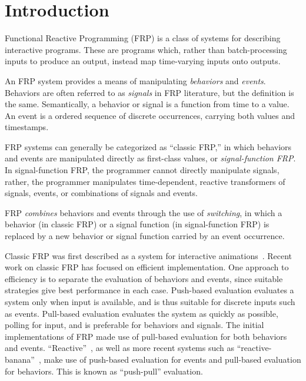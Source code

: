 \section{Introduction}
\label{section:Introduction}

Functional Reactive Programming (FRP) is a class of systems for describing
interactive programs. These are programs which, rather than batch-processing
inputs to produce an output, instead map time-varying inputs onto outputs.


An FRP system provides a means of manipulating {\em behaviors} and
{\em events}. Behaviors are often referred to as {\em signals} in FRP literature,
but the definition is the same.  Semantically, a behavior or signal is a
function from time to a value. An event is a ordered sequence of discrete
occurrences, carrying both values and timestamps.

FRP systems can generally be categorized as ``classic FRP,'' in which behaviors
and events are manipulated directly as first-class values,
or {\em signal-function FRP}. In signal-function FRP, the programmer cannot
directly manipulate signals, rather, the programmer manipulates time-dependent,
reactive transformers of signals, events, or combinations of signals and events.

FRP {\em combines} behaviors and events through the use of {\em switching}, in which
a behavior (in classic FRP) or a signal function (in signal-function FRP) is
replaced by a new behavior or signal function carried by an event occurrence.


Classic FRP was first described as a system for interactive animations~\cite{Elliott1997}.
Recent work on classic FRP has focused on efficient implementation. One approach
to efficiency is to separate the evaluation of behaviors and events, since
suitable strategies give best performance in each case. Push-based evaluation
evaluates a system only when input is available, and is thus suitable for
discrete inputs such as events. Pull-based evaluation evaluates the system as
quickly as possible, polling for input, and is preferable for behaviors and
signals. The initial implementations of FRP made use of pull-based evaluation
for both behaviors and events. ``Reactive''~\cite{Elliott2009}, as well as more
recent systems such as ``reactive-banana''~\cite{Apfelmus}, make use of
push-based evaluation for events and pull-based evaluation for behaviors. This
is known as ``push-pull'' evaluation.


